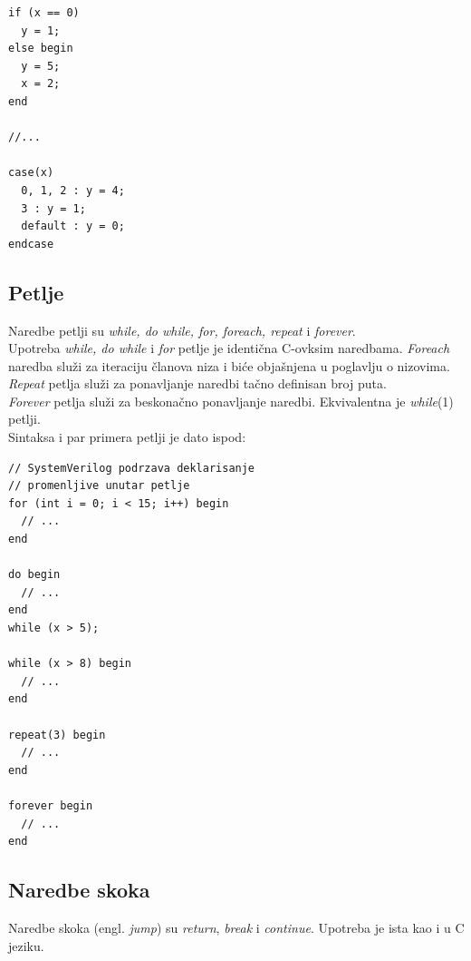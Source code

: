 \begin{lstlisting}
if (x == 0)
  y = 1;
else begin
  y = 5;
  x = 2;
end
  
//...
  
case(x)
  0, 1, 2 : y = 4;
  3 : y = 1;
  default : y = 0;
endcase
\end{lstlisting}


\subsection{Petlje}

Naredbe petlji su \emph{while, do while, for, foreach, repeat} i
\emph{forever}.\\

Upotreba \emph{while, do while} i \emph{for} petlje je identična C-ovksim
naredbama.
\emph{Foreach} naredba služi za iteraciju članova niza i biće objašnjena u
poglavlju o nizovima.\\

\emph{Repeat} petlja služi za ponavljanje naredbi tačno definisan broj puta.\\

\emph{Forever} petlja služi za beskonačno ponavljanje naredbi. Ekvivalentna je \emph{while}(1) petlji.\\

Sintaksa i par primera petlji je dato ispod:

\begin{lstlisting}
// SystemVerilog podrzava deklarisanje
// promenljive unutar petlje
for (int i = 0; i < 15; i++) begin
  // ...
end

do begin
  // ...
end
while (x > 5);

while (x > 8) begin
  // ...
end

repeat(3) begin
  // ...
end

forever begin
  // ...
end
\end{lstlisting}


\subsection{Naredbe skoka}

Naredbe skoka (engl. \emph{jump}) su \emph{return}, \emph{break} i
\emph{continue}.
Upotreba je ista kao i u C jeziku.

